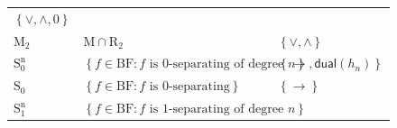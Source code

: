 \documentclass[10pt,a4paper]{article}
\newcommand{\set}[1]{\left\{#1\right\}}
\newcommand{\dual}{\mathsf{dual}}
\newcommand{\clonefont}[1]{\mathrm{#1}}
\begin{document}
\begin{figure}[hbtp]
\begin{small}
\begin{longtable}[]{p{}p{}p{}}
\begin{minipage}[t]{0.38\columnwidth}
                \(\set{\lor,\land,0}\)\strut
            \end{minipage}\tabularnewline
            \begin{minipage}[t]{0.12\columnwidth}\raggedright
                \(\clonefont{M_2}\)\strut
            \end{minipage} & \begin{minipage}[t]{0.41\columnwidth}\raggedright
                \(\clonefont{M} \cap \clonefont{R_2}\)\strut
            \end{minipage} & \begin{minipage}[t]{0.38\columnwidth}\raggedright
                \(\set{\lor,\land}\)\strut
            \end{minipage}\tabularnewline
            \begin{minipage}[t]{0.12\columnwidth}\raggedright
                \(\clonefont{S_0^n}\)\strut
            \end{minipage} & \begin{minipage}[t]{0.41\columnwidth}\raggedright
                \(\set{f \in \clonefont{BF} : f \text{ is $0$-separating of degree $n$}}\)\strut
            \end{minipage} & \begin{minipage}[t]{0.38\columnwidth}\raggedright
                \(\set{\rightarrow,\dual(h_n)}\)\strut
            \end{minipage}\tabularnewline
            \begin{minipage}[t]{0.12\columnwidth}\raggedright
                \(\clonefont{S_0}\)\strut
            \end{minipage} & \begin{minipage}[t]{0.41\columnwidth}\raggedright
                \(\set{f \in \clonefont{BF} : f \text{ is $0$-separating}}\)\strut
            \end{minipage} & \begin{minipage}[t]{0.38\columnwidth}\raggedright
                \(\set{\rightarrow}\)\strut
            \end{minipage}\tabularnewline
            \begin{minipage}[t]{0.12\columnwidth}\raggedright
                \(\clonefont{S_1^n}\)\strut
            \end{minipage} & \begin{minipage}[t]{0.41\columnwidth}\raggedright
                \(\set{f \in \clonefont{BF} : f \text{ is $1$-separating of degree $n$}}\)\strut
            \end{minipage} & \begin{minipage}[t]{0.38\columnwidth}\raggedright

\end{minipage}
\end{longtable}
\end{small}
\end{figure}
\end{document}
